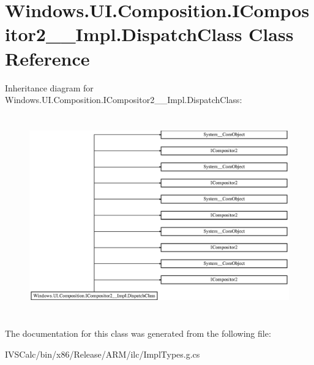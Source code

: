 \hypertarget{class_windows_1_1_u_i_1_1_composition_1_1_i_compositor2_____impl_1_1_dispatch_class}{}\section{Windows.\+U\+I.\+Composition.\+I\+Compositor2\+\_\+\+\_\+\+Impl.\+Dispatch\+Class Class Reference}
\label{class_windows_1_1_u_i_1_1_composition_1_1_i_compositor2_____impl_1_1_dispatch_class}
Inheritance diagram for Windows.\+U\+I.\+Composition.\+I\+Compositor2\+\_\+\+\_\+\+Impl.\+Dispatch\+Class\+:\begin{figure}[H]
\begin{center}
\leavevmode
\includegraphics[height=8.700564cm]{class_windows_1_1_u_i_1_1_composition_1_1_i_compositor2_____impl_1_1_dispatch_class}
\end{center}
\end{figure}


The documentation for this class was generated from the following file\+:\begin{DoxyCompactItemize}
\item 
I\+V\+S\+Calc/bin/x86/\+Release/\+A\+R\+M/ilc/Impl\+Types.\+g.\+cs\end{DoxyCompactItemize}
